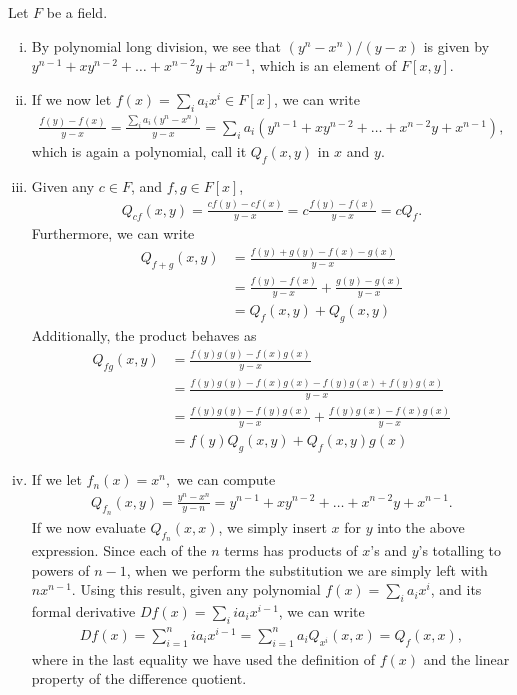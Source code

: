 \documentclass{../../mathnotes}
\begin{document}
Let $F$ be a field.
\begin{enumerate}[(i)]
    \item By polynomial long division, we see that $(y^n-x^n)/(y-x)$ is given by $y^{n-1}+xy^{n-2}+\ldots+x^{n-2}y+x^{n-1}$,
        which is an element of $F[x,y]$.
    \item If we now let $f(x)=\sum_i a_ix^i\in F[x]$, we can write
        \begin{align*}
            \frac{f(y)-f(x)}{y-x}=\frac{\sum_ia_i(y^n-x^n)}{y-x}=\sum_ia_i\left( y^{n-1}+xy^{n-2}+\ldots+x^{n-2}y+x^{n-1} \right),
        \end{align*}
        which is again a polynomial, call it $Q_f(x,y)$ in $x$ and $y$.
    \item Given any $c\in F$, and $f,g\in F[x]$,
        \begin{align*}
            Q_{cf}(x,y)=\frac{cf(y)-cf(x)}{y-x}=c\frac{f(y)-f(x)}{y-x}=cQ_f.
        \end{align*}
        Furthermore, we can write
        \begin{align*}
            Q_{f+g}(x,y)&=\frac{f(y)+g(y)-f(x)-g(x)}{y-x}\\
            &=\frac{f(y)-f(x)}{y-x}+\frac{g(y)-g(x)}{y-x}\\
            &=Q_f(x,y)+Q_g(x,y)
        \end{align*}
        Additionally, the product behaves as
        \begin{align*}
            Q_{fg}(x,y)&=\frac{f(y)g(y)-f(x)g(x)}{y-x}\\
            &=\frac{f(y)g(y)-f(x)g(x)-f(y)g(x)+f(y)g(x)}{y-x}\\
            &=\frac{f(y)g(y)-f(y)g(x)}{y-x}+\frac{f(y)g(x)-f(x)g(x)}{y-x}\\
            &=f(y)Q_g(x,y)+Q_f(x,y)g(x)
        \end{align*}
    \item If we let $f_n(x)=x^n,$ we can compute
        \begin{align*}
            Q_{f_n}(x,y)=\frac{y^n-x^n}{y-n}=y^{n-1}+xy^{n-2}+\ldots+x^{n-2}y+x^{n-1}.
        \end{align*}
        If we now evaluate $Q_{f_n}(x,x)$, we simply insert $x$ for $y$ into the above expression. Since each of the $n$ terms has products
        of $x$'s and $y$'s totalling to powers of $n-1$, when we perform the substitution we are simply left with $nx^{n-1}$.
        Using this result, given any polynomial $f(x)=\sum_ia_ix^i$, and its formal derivative $Df(x)=\sum_iia_ix^{i-1}$,
        we can write
        \begin{align*}
            Df(x)=\sum_{i=1}^nia_ix^{i-1}=\sum_{i=1}^n a_iQ_{x^i}(x,x)=Q_{f}(x,x),
        \end{align*}
        where in the last equality we have used the definition of $f(x)$ and the linear property of the difference quotient.
\end{enumerate}
\end{document}
